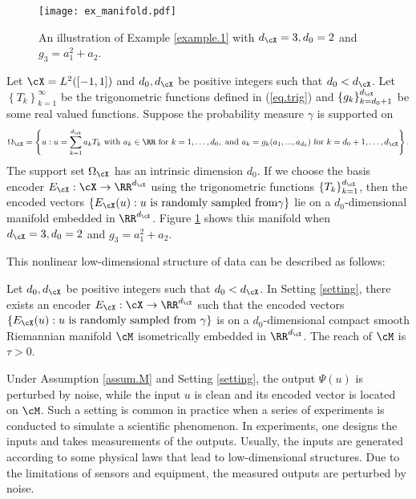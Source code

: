 \documentclass[11pt]{article} %
\begin{document}
 \begin{wrapfigure}{r}{0.5\textwidth}
 \centering
\texttt{[image: ex\_manifold.pdf]}  
\caption{An illustration of Example \ref{example.1} with $d_{\cX}=3, d_0=2$ and $g_3=a_1^2+a_2$. }
			\label{fig.ex.manifold}
			\end{wrapfigure}

\begin{example}\label{example.1}
	Let $\cX=L^2([-1,1])$ and $d_0, d_{\cX}$ be positive integers such that $d_0<d_{\cX}$. Let $\left\{T_k\right\}_{k=1}^{\infty}$ be the trigonometric functions defined in (\ref{eq.trig}) and $\left\{g_k\right\}_{k=d_0+1}^{d_{\cX}}$ be some real valued functions. Suppose the probability measure $\gamma$ is supported on 
	$$
	\Omega_{\cX}=\left\{u: u=\sum_{k=1}^{d_{\cX}} a_kT_k \mbox{ with } a_k\in \RR \mbox{ for } k=1,\ldots, d_0, \mbox{ and } a_k=g_k(a_1,...,a_{d_0}) \mbox{ for } k=d_0+1,\ldots,d_{\cX} \right\}.
	$$
	The support set $\Omega_{\cX}$ has an intrinsic dimension $d_0$. If we choose the basis encoder $E_{\cX}: \cX \rightarrow \RR^{d_{\cX}}$ using the trigonometric functions $\{T_k\}_{k=1}^{d_{\cX}}$, then the encoded vectors $\{E_{\cX}(u): u \text{ is randomly sampled from} \gamma\}$ lie on a $d_0$-dimensional manifold embedded in $\RR^{d_{\cX}}$. Figure \ref{fig.ex.manifold} shows this manifold when $d_{\cX}=3, d_0=2$ and $g_3=a_1^2+a_2$.
	\end{example}

This nonlinear low-dimensional structure of data can be described as follows:

\begin{assumption}\label{assum.M}  Let $d_0, d_{\cX}$ be positive integers such that $d_0<d_{\cX}$. In Setting \ref{setting}, there exists an encoder $E_{\cX}: \cX \rightarrow \RR^{d_{\cX}}$ such that the encoded vectors $\{E_{\cX}(u): u \text{ is randomly sampled from } \gamma\}$ is on a $d_0$-dimensional compact smooth Riemannian manifold $\cM$ isometrically embedded in $\RR^{d_{\cX}}$. The reach of $\cM$ \citep{federer1959curvature,niyogi2008finding} is $\tau>0$.	 
\end{assumption}

Under Assumption \ref{assum.M} and Setting \ref{setting}, the output $\Psi(u)$ is perturbed by noise, while the input $u$ is clean and its encoded vector is located on $\cM$. Such a setting is common in practice when a series of experiments is conducted to simulate a scientific phenomenon. In experiments, one designs the inputs and takes measurements of the outputs. Usually, the inputs are generated according to some physical laws that lead to low-dimensional structures. Due to the limitations of sensors and equipment, the measured outputs are perturbed by noise.
\end{document}
